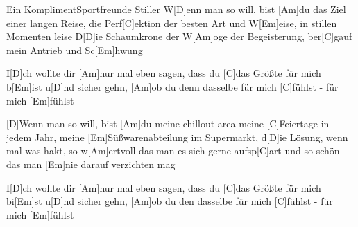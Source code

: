 \documentclass[../main.tex]{subfiles}
\begin{document}
\begin{songwithoutpagebreak}{Ein Kompliment}{Sportfreunde Stiller}{}
W[D]enn man so will, bist [Am]du das Ziel einer langen Reise,
die Perf[C]ektion der besten Art und W[Em]eise, in stillen Momenten leise
D[D]ie Schaumkrone der W[Am]oge der Begeisterung, ber[C]gauf mein Antrieb und Sc[Em]hwung
 
I[D]ch wollte dir [Am]nur mal eben sagen, dass du [C]das Größte für mich b[Em]ist
u[D]nd sicher gehn, [Am]ob du denn dasselbe für mich [C]fühlst - für mich [Em]fühlst
 
[D]Wenn man so will, bist [Am]du meine chillout-area meine [C]Feiertage in jedem Jahr,
meine [Em]Süßwarenabteilung im Supermarkt,
d[D]ie Lösung, wenn mal was hakt, so w[Am]ertvoll das man es sich gerne aufsp[C]art 
und so schön das man [Em]nie darauf verzichten mag
 
I[D]ch wollte dir [Am]nur mal eben sagen, dass du [C]das Größte für mich bi[Em]st
u[D]nd sicher gehn, [Am]ob du den dasselbe für mich [C]fühlst - für mich [Em]fühlst
\end{songwithoutpagebreak}
\end{document}
